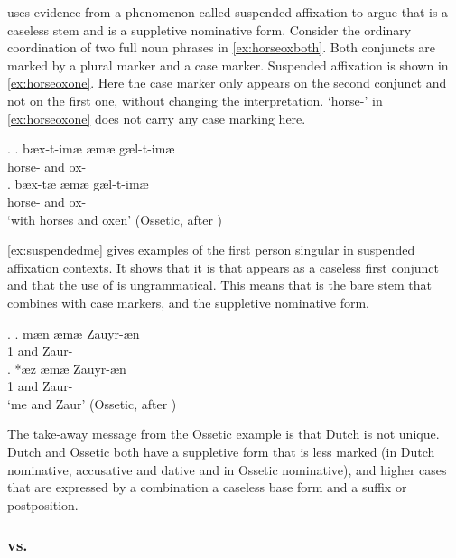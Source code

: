 \documentclass[11pt,a4paper]{article}
\begin{document}
\citet{caha2019competition} uses evidence from a phenomenon called suspended affixation to argue that  is a caseless stem and  is a suppletive nominative form. Consider the ordinary coordination of two full noun phrases in \ref{ex:horseoxboth}. Both conjuncts are marked by a plural marker and a case marker. Suspended affixation is shown in \ref{ex:horseoxone}. Here the case marker only appears on the second conjunct and not on the first one, without changing the interpretation.
 `horse-' in \ref{ex:horseoxone} does not carry any case marking here.

\ex.
\ag. bæx-t-imæ æmæ gæl-t-imæ\\
horse- and ox-\\\label{ex:horseoxboth}
\bg. bæx-tæ æmæ gæl-t-imæ\\
horse- and ox-\\
`with horses and oxen' \hfill (Ossetic, \citealt[165]{erschler2012} after \citealt{caha2019competition})\label{ex:horseoxone}

\ref{ex:suspendedme} gives examples of the first person singular in suspended affixation contexts. It shows that it is  that appears as a caseless first conjunct and that the use of  is ungrammatical. This means that  is the bare stem that combines with case markers, and  the suppletive nominative form.

\ex.\label{ex:suspendedme}
\ag. mæn æmæ Zauyr-æn\\
 1 and Zaur-\\\label{ex:izaurboth}
\bg. *æz æmæ Zauyr-æn\\
 1 and Zaur-\\
 `me and Zaur' \hfill (Ossetic, \citealt[39]{беляев2014} after \citealt{caha2019competition})\label{ex:izaurone}

The take-away message from the Ossetic example is that Dutch is not unique. Dutch and Ossetic both have a suppletive form that is less marked (in Dutch nominative, accusative and dative and in Ossetic nominative), and higher cases that are expressed by a combination a caseless base form and a suffix or postposition.


\subsubsection{ vs. }
\end{document}
